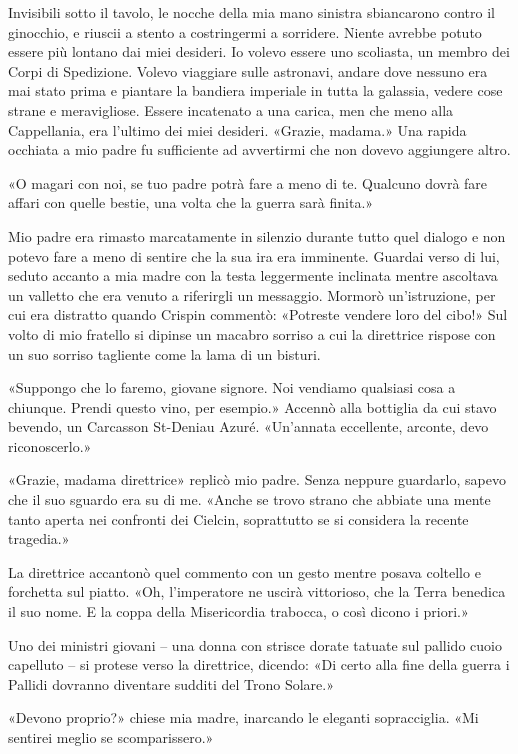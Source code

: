 Invisibili sotto il tavolo, le nocche della mia mano sinistra
sbiancarono contro il ginocchio, e riuscii a stento a costringermi a
sorridere. Niente avrebbe potuto essere più lontano dai miei desideri.
Io volevo essere uno scoliasta, un membro dei Corpi di Spedizione.
Volevo viaggiare sulle astronavi, andare dove nessuno era mai stato
prima e piantare la bandiera imperiale in tutta la galassia, vedere cose
strane e meravigliose. Essere incatenato a una carica, men che meno alla
Cappellania, era l'ultimo dei miei desideri. «Grazie, madama.» Una
rapida occhiata a mio padre fu sufficiente ad avvertirmi che non dovevo
aggiungere altro.

«O magari con noi, se tuo padre potrà fare a meno di te. Qualcuno dovrà
fare affari con quelle bestie, una volta che la guerra sarà finita.»

Mio padre era rimasto marcatamente in silenzio durante tutto quel
dialogo e non potevo fare a meno di sentire che la sua ira era
imminente. Guardai verso di lui, seduto accanto a mia madre con la testa
leggermente inclinata mentre ascoltava un valletto che era venuto a
riferirgli un messaggio. Mormorò un'istruzione, per cui era distratto
quando Crispin commentò: «Potreste vendere loro del cibo!» Sul volto di
mio fratello si dipinse un macabro sorriso a cui la direttrice rispose
con un suo sorriso tagliente come la lama di un bisturi.

«Suppongo che lo faremo, giovane signore. Noi vendiamo qualsiasi cosa a
chiunque. Prendi questo vino, per esempio.» Accennò alla bottiglia da
cui stavo bevendo, un Carcasson St-Deniau Azuré. «Un'annata eccellente,
arconte, devo riconoscerlo.»

«Grazie, madama direttrice» replicò mio padre. Senza neppure guardarlo,
sapevo che il suo sguardo era su di me. «Anche se trovo strano che
abbiate una mente tanto aperta nei confronti dei Cielcin, soprattutto se
si considera la recente tragedia.»

La direttrice accantonò quel commento con un gesto mentre posava
coltello e forchetta sul piatto. «Oh, l'imperatore ne uscirà vittorioso,
che la Terra benedica il suo nome. E la coppa della Misericordia
trabocca, o così dicono i priori.»

Uno dei ministri giovani -- una donna con strisce dorate tatuate sul
pallido cuoio capelluto -- si protese verso la direttrice, dicendo: «Di
certo alla fine della guerra i Pallidi dovranno diventare sudditi del
Trono Solare.»

«Devono proprio?» chiese mia madre, inarcando le eleganti sopracciglia.
«Mi sentirei meglio se scomparissero.»

